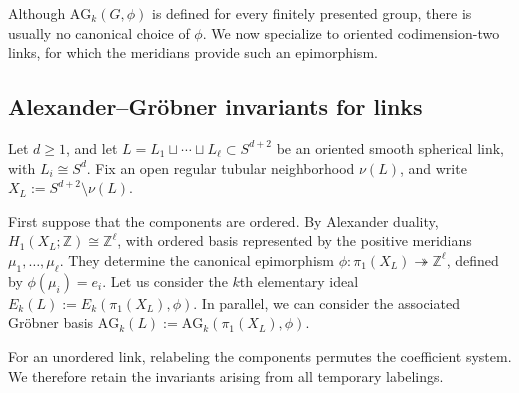 \documentclass{article}
\theoremstyle{definition}
\newtheorem{definition}{Definition}[section]
\theoremstyle{plain}
\newcommand{\AG}{\mathrm{AG}}
\newcommand{\Z}{\mathbb{Z}}
\begin{document}
Although \(\AG_k(G,\phi)\) is defined for every finitely presented group,
there is usually no canonical choice of \(\phi\). We now specialize to
oriented codimension-two links, for which the meridians provide such an
epimorphism.

\subsection{Alexander--Gr\"obner invariants for links}\label{sec:links}

Let \(d\ge1\), and let \(L=L_1\sqcup\cdots\sqcup L_\ell\subset S^{d+2}\) be an oriented
smooth spherical link, with \(L_i\cong S^d\). Fix an open regular tubular
neighborhood \(\nu(L)\), and write \(X_L:=S^{d+2}\setminus\nu(L)\).

First suppose that the components are ordered. By Alexander duality,
\(H_1(X_L;\Z)\cong\Z^\ell\), with ordered basis represented by the
positive meridians \(\mu_1,\dots,\mu_\ell\). They determine the canonical
epimorphism \(\phi\colon\pi_1(X_L)\twoheadrightarrow\Z^\ell\), defined by
\(\phi(\mu_i)=e_i\).
Let us consider the \(k\)th elementary ideal
\(E_k(L):=E_k(\pi_1(X_L),\phi)\).
In parallel, we can consider the associated Gr\"obner basis
\(\AG_k(L):=\AG_k(\pi_1(X_L),\phi)\).


For an unordered link, relabeling the components permutes the coefficient
system. We therefore retain the invariants arising from all temporary
labelings.
\end{document}
